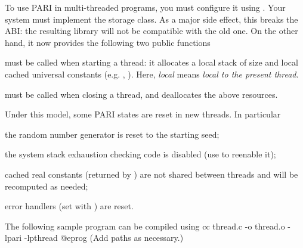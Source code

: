 %
%

To use PARI in multi-threaded programs, you must configure it using
. Your system must implement the 
storage class. As a major side effect, this breaks the  ABI: the
resulting library will not be compatible with the old one. On the other hand,
it now provides the following two public functions

 must be called when starting a
thread: it allocates a local stack of size  and local cached
universal constants (e.g. , ). Here, \emph{local} means
\emph{local to the present thread}.

 must be called when closing a thread,
and deallocates the above resources.

Under this model, some PARI states are reset in new threads. In particular

\item the random number generator is reset to the starting seed;

\item the system stack exhaustion checking code is disabled (use
 to reenable it);

\item cached real constants (returned by ) are not
shared between threads and will be recomputed as needed;

\item error handlers (set with ) are reset.

\noindent The following sample program can be compiled using
\bprog
    cc thread.c -o thread.o -lpari -lpthread
@eprog\noindent
(Add  paths as necessary.)

\noindent{}

\vfill\eject
